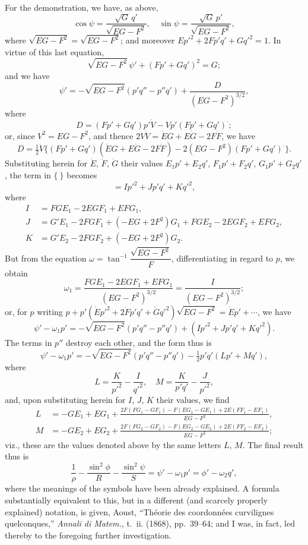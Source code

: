\documentclass[11pt,a4paper]{article}
\theoremstyle{definition}
\begin{document}
For the demonstration, we have, as above,
\[
\cos\psi = \frac{\sqrt{G}\,q'}{\sqrt{EG - F^2}},\quad \sin\psi = \frac{\sqrt{G}\,p'}{\sqrt{EG - F^2}},
\]
where $\sqrt{EG - F^2} = \sqrt{EG - F^2}$; and moreover $Ep'^2 + 2Fp'q' + Gq'^2 = 1$. In virtue of this last equation,
\[
\sqrt{EG - F^2}\,\psi' + (Fp' + Gq')^2 = G;
\]
and we have
\[
\psi' = -\sqrt{EG - F^2}(p'q'' - p''q') + \frac{D}{(EG - F^2)^{3/2}},
\]
where
\[
D = (Fp' + Gq')p'\dot{V} - Vp'(Fp' + Gq')^\cdot;
\]
or, since $V^2 = EG - F^2$, and thence $2V\dot{V} = \dot{E}G + E\dot{G} - 2F\dot{F}$, we have
\[
D = \tfrac{1}{2}\dot{V}\{(Fp' + Gq')(\dot{E}G + E\dot{G} - 2F\dot{F}) - 2(EG - F^2)(Fp' + Gq')^\cdot\}.
\]
Substituting herein for $\dot{E}$, $\dot{F}$, $\dot{G}$ their values $E_1p' + E_2q'$, $F_1p' + F_2q'$, $G_1p' + G_2q'$, the term in $\{\ \}$ becomes
\[
= Ip'^2 + Jp'q' + Kq'^2,
\]
where
\[
\begin{aligned}
I &= FGE_1 - 2EGF_1 + EFG_1,\\
J &= G'E_1 - 2FGF_1 + (-EG + 2F^2)G_1 + FGE_2 - 2EGF_2 + EFG_2,\\
K &= G'E_2 - 2FGF_2 + (-EG + 2F^2)G_2.
\end{aligned}
\]
But from the equation $\omega = \tan^{-1}\dfrac{\sqrt{EG - F^2}}{F}$, differentiating in regard to $p$, we obtain
\[
\omega_1 = \frac{FGE_1 - 2EGF_1 + EFG_1}{(EG - F^2)^{3/2}} = \frac{I}{(EG - F^2)^{3/2}};
\]
or, for $p$ writing $p + p'(\dot{E}p'^2 + 2\dot{F}p'q' + \dot{G}q'^2)\sqrt{EG - F^2} = \dot{E}p' + \dotsb$, we have
\[
\psi' - \omega_1 p' = -\sqrt{EG - F^2}(p'q'' - p''q') + (Ip'^2 + Jp'q' + Kq'^2).
\]
The terms in $p''$ destroy each other, and the form thus is
\[
\psi' - \omega_1 p' = -\sqrt{EG - F^2}(p'q'' - p''q') - \tfrac{1}{2}p'q'(Lp' + Mq'),
\]
where
\[
L = \frac{K}{p'^2} - \frac{I}{q'^2},\quad M = \frac{K}{p'q'} - \frac{J}{p'^2},
\]
and, upon substituting herein for $I$, $J$, $K$ their values, we find
\[
\begin{aligned}
L &= -GE_1 + EG_1 + \frac{2F(FG_1 - GF_1) - F(EG_1 - GE_1) + 2E(FF_1 - EF_1)}{EG - F^2},\\
M &= -GE_2 + EG_2 + \frac{2F(FG_2 - GF_2) - F(EG_2 - GE_2) + 2E(FF_2 - EF_2)}{EG - F^2};
\end{aligned}
\]
viz., these are the values denoted above by the same letters $L$, $M$. The final result thus is
\[
\frac{1}{\rho} - \frac{\sin^2\phi}{R} - \frac{\sin^2\psi}{S} = \psi' - \omega_1 p' = \phi' - \omega_2 q',
\]
where the meanings of the symbols have been already explained. A formula substantially equivalent to this, but in a different (and scarcely properly explained) notation, is given, Aoust, ``Th\'eorie des coordonn\'ees curvilignes quelconques,'' \textit{Annali di Matem.}, t.~ii. (1868), pp.~39--64; and I was, in fact, led thereby to the foregoing further investigation.
\end{document}
